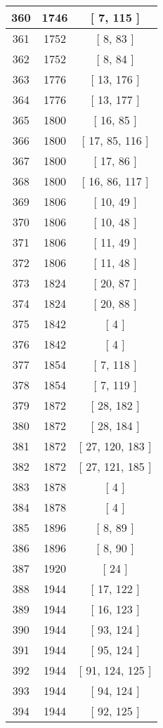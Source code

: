 \begin{center}
\begin{longtable}[H]{|| c c c ||}
\hline
360 & 1746 & [ 7, 115 ] \\ 
\hline
361 & 1752 & [ 8, 83 ] \\ 
\hline
362 & 1752 & [ 8, 84 ] \\ 
\hline
363 & 1776 & [ 13, 176 ] \\ 
\hline
364 & 1776 & [ 13, 177 ] \\ 
\hline
365 & 1800 & [ 16, 85 ] \\ 
\hline
366 & 1800 & [ 17, 85, 116 ] \\ 
\hline
367 & 1800 & [ 17, 86 ] \\ 
\hline
368 & 1800 & [ 16, 86, 117 ] \\ 
\hline
369 & 1806 & [ 10, 49 ] \\ 
\hline
370 & 1806 & [ 10, 48 ] \\ 
\hline
371 & 1806 & [ 11, 49 ] \\ 
\hline
372 & 1806 & [ 11, 48 ] \\ 
\hline
373 & 1824 & [ 20, 87 ] \\ 
\hline
374 & 1824 & [ 20, 88 ] \\ 
\hline
375 & 1842 & [ 4 ] \\ 
\hline
376 & 1842 & [ 4 ] \\ 
\hline
377 & 1854 & [ 7, 118 ] \\ 
\hline
378 & 1854 & [ 7, 119 ] \\ 
\hline
379 & 1872 & [ 28, 182 ] \\ 
\hline
380 & 1872 & [ 28, 184 ] \\ 
\hline
381 & 1872 & [ 27, 120, 183 ] \\ 
\hline
382 & 1872 & [ 27, 121, 185 ] \\ 
\hline
383 & 1878 & [ 4 ] \\ 
\hline
384 & 1878 & [ 4 ] \\ 
\hline
385 & 1896 & [ 8, 89 ] \\ 
\hline
386 & 1896 & [ 8, 90 ] \\ 
\hline
387 & 1920 & [ 24 ] \\ 
\hline
388 & 1944 & [ 17, 122 ] \\ 
\hline
389 & 1944 & [ 16, 123 ] \\ 
\hline
390 & 1944 & [ 93, 124 ] \\ 
\hline
391 & 1944 & [ 95, 124 ] \\ 
\hline
392 & 1944 & [ 91, 124, 125 ] \\ 
\hline
393 & 1944 & [ 94, 124 ] \\ 
\hline
394 & 1944 & [ 92, 125 ] \\ 

\end{longtable}
\end{center}
